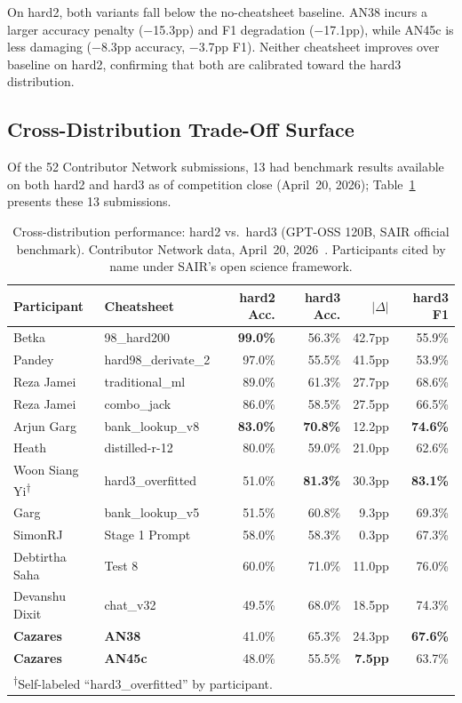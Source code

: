 \documentclass[11pt]{article}
\begin{document}
On hard2, both variants fall below the no-cheatsheet baseline. AN38
incurs a larger accuracy penalty ($-$15.3pp) and F1 degradation
($-$17.1pp), while AN45c is less damaging ($-$8.3pp accuracy,
$-$3.7pp F1). Neither cheatsheet improves over baseline on hard2,
confirming that both are calibrated toward the hard3 distribution.

\subsection{Cross-Distribution Trade-Off Surface}

Of the 52 Contributor Network submissions, 13 had benchmark results
available on both hard2 and hard3 as of competition close
(April~20, 2026); Table~\ref{tab:crossdist} presents these 13 submissions.

\begin{table}[h]
\centering
\caption{Cross-distribution performance: hard2 vs.\ hard3
(GPT-OSS 120B, SAIR official benchmark). Contributor Network
data, April~20, 2026~\citep{sair2026leaderboard}.
Participants cited by name under SAIR's open science framework.}
\label{tab:crossdist}
\small
\begin{tabular}{llrrrr}
\toprule
Participant & Cheatsheet & hard2 Acc. & hard3 Acc. & $|\Delta|$ & hard3 F1 \\
\midrule
Betka       & 98\_hard200           & \textbf{99.0\%} & 56.3\% & 42.7pp & 55.9\% \\
Pandey      & hard98\_derivate\_2   & 97.0\%          & 55.5\% & 41.5pp & 53.9\% \\
Reza Jamei  & traditional\_ml       & 89.0\%          & 61.3\% & 27.7pp & 68.6\% \\
Reza Jamei  & combo\_jack           & 86.0\%          & 58.5\% & 27.5pp & 66.5\% \\
Arjun Garg  & bank\_lookup\_v8      & \textbf{83.0\%} & \textbf{70.8\%} & 12.2pp & \textbf{74.6\%} \\
Heath       & distilled-r-12        & 80.0\%          & 59.0\% & 21.0pp & 62.6\% \\
Woon Siang Yi\textsuperscript{$\dagger$} & hard3\_overfitted & 51.0\% & \textbf{81.3\%} & 30.3pp & \textbf{83.1\%} \\
Garg        & bank\_lookup\_v5      & 51.5\%          & 60.8\% & 9.3pp  & 69.3\% \\
SimonRJ     & Stage 1 Prompt        & 58.0\%          & 58.3\% & 0.3pp  & 67.3\% \\
Debtirtha Saha & Test 8             & 60.0\%          & 71.0\% & 11.0pp & 76.0\% \\
Devanshu Dixit & chat\_v32          & 49.5\%          & 68.0\% & 18.5pp & 74.3\% \\
\textbf{Cazares} & \textbf{AN38}   & 41.0\%          & 65.3\% & 24.3pp & \textbf{67.6\%} \\
\textbf{Cazares} & \textbf{AN45c}  & 48.0\%          & 55.5\% & \textbf{7.5pp}  & 63.7\% \\
\bottomrule
\multicolumn{6}{l}{\textsuperscript{$\dagger$}Self-labeled ``hard3\_overfitted'' by participant.}
\end{tabular}
\end{table}
\end{document}
